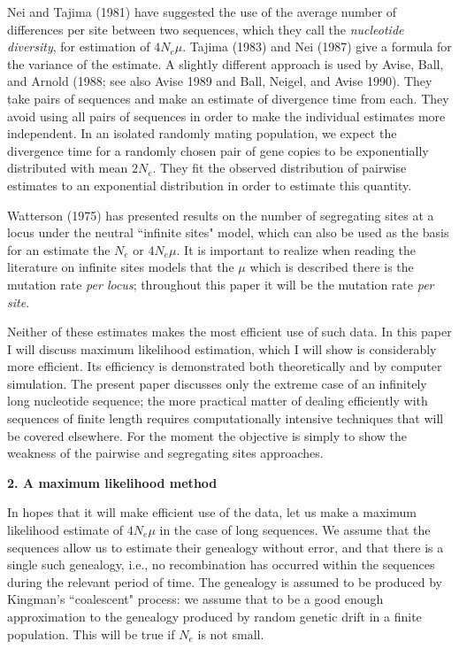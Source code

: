 Nei and Tajima (1981) have suggested the use of the average number of
differences per site between two sequences, which they call the {\it nucleotide
diversity}, for estimation of $4N_e\mu$.  Tajima (1983) and Nei (1987)
give a formula for the variance of the estimate.  A slightly different
approach is used by Avise, Ball, and Arnold (1988; see also Avise
1989 and Ball, Neigel, and Avise 1990).  They take pairs of sequences and
make an estimate of divergence
time from each.  They avoid using all pairs of sequences in order to
make the individual estimates more independent.  In an isolated randomly mating
population, we expect the divergence time for a randomly chosen pair of
gene copies to be exponentially distributed with mean $2N_e$.  They fit
the observed distribution of pairwise estimates to an exponential
distribution in order to estimate this quantity.

Watterson (1975) has presented results on the number of segregating sites
at a locus under the neutral ``infinite sites" model, which can also be
used as the basis for an estimate the $N_e$ or $4N_e\mu$.  It is important
to realize when reading the literature on infinite sites models that
the $\mu$ which is described there is the mutation rate {\it per locus};
throughout this paper it will be the mutation rate {\it per site}.

Neither of these estimates makes the most efficient use of such data.  In
this paper I will discuss maximum likelihood estimation, which I will
show is considerably more efficient.  Its efficiency is demonstrated both
theoretically and by computer simulation.  The present paper discusses
only the extreme case of an infinitely long nucleotide sequence;
the more practical matter of dealing efficiently with sequences of
finite length requires computationally intensive techniques that will be
covered elsewhere.  For the moment the objective is simply to show the
weakness of the pairwise and segregating sites approaches.

\bigskip
{\bf 2. A maximum likelihood method}

\medskip
In hopes that it will make efficient use of the data, let us make a
maximum likelihood estimate of $4N_e\mu$ in the case of long sequences.  We
assume that the sequences allow us to estimate their genealogy without
error, and that there is a single such genealogy, i.e., no recombination
has occurred within the sequences during the relevant period of time.
The genealogy is assumed to be produced by Kingman's ``coalescent"
process: we assume that to be a good enough approximation to the
genealogy produced by random genetic drift in a finite population.  This
will be true if $N_e$ is not small.

